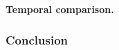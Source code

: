 \documentclass{article}
\newcommand{\authors}{}
\begin{document}
\textbf{Temporal comparison.}

\subsubsection{Conclusion}





%     

\end{document}
